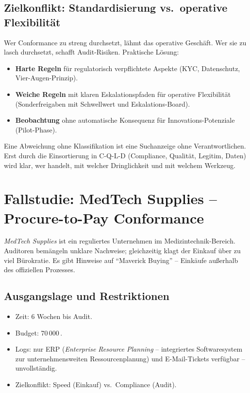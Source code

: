 \documentclass[11pt,a4paper,oneside]{article}
\begin{document}
\subsection{Zielkonflikt: Standardisierung vs.\ operative Flexibilität}

Wer Conformance zu streng durchsetzt, lähmt das operative Geschäft. Wer sie zu lasch durchsetzt, schafft Audit-Risiken. Praktische Lösung:

\begin{itemize}
  \item \textbf{Harte Regeln} für regulatorisch verpflichtete Aspekte (KYC, Datenschutz, Vier-Augen-Prinzip).
  \item \textbf{Weiche Regeln} mit klaren Eskalationspfaden für operative Flexibilität (Sonderfreigaben mit Schwellwert und Eskalations-Board).
  \item \textbf{Beobachtung} ohne automatische Konsequenz für Innovations-Potenziale (Pilot-Phase).
\end{itemize}

\begin{merkbox}
Eine Abweichung ohne Klassifikation ist eine Suchanzeige ohne Verantwortlichen. Erst durch die Einsortierung in C-Q-L-D (Compliance, Qualität, Legitim, Daten) wird klar, wer handelt, mit welcher Dringlichkeit und mit welchem Werkzeug.
\end{merkbox}

\section{Fallstudie: MedTech Supplies -- Procure-to-Pay Conformance}

\emph{MedTech Supplies} ist ein reguliertes Unternehmen im Medizintechnik-Bereich. Auditoren bemängeln unklare Nachweise; gleichzeitig klagt der Einkauf über zu viel Bürokratie. Es gibt Hinweise auf ``Maverick Buying'' -- Einkäufe außerhalb des offiziellen Prozesses.

\subsection{Ausgangslage und Restriktionen}

\begin{itemize}
  \item Zeit: 6 Wochen bis Audit.
  \item Budget: 70\,000\,\text{\euro}.
  \item Logs: nur ERP (\emph{Enterprise Resource Planning} -- integriertes Softwaresystem zur unternehmensweiten Ressourcenplanung) und E-Mail-Tickets verfügbar -- unvollständig.
  \item Zielkonflikt: Speed (Einkauf) vs.\ Compliance (Audit).
\end{itemize}
\end{document}
